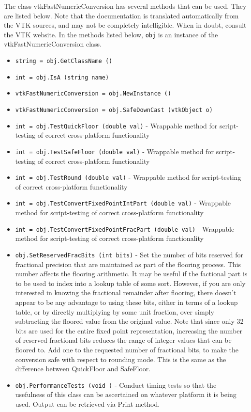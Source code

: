 The class vtkFastNumericConversion has several methods that can be used.
  They are listed below.
Note that the documentation is translated automatically from the VTK sources,
and may not be completely intelligible.  When in doubt, consult the VTK website.
In the methods listed below, \verb|obj| is an instance of the vtkFastNumericConversion class.
\begin{itemize}
\item  \verb|string = obj.GetClassName ()|

\item  \verb|int = obj.IsA (string name)|

\item  \verb|vtkFastNumericConversion = obj.NewInstance ()|

\item  \verb|vtkFastNumericConversion = obj.SafeDownCast (vtkObject o)|

\item  \verb|int = obj.TestQuickFloor (double val)| -  Wrappable method for script-testing of correct cross-platform
 functionality

\item  \verb|int = obj.TestSafeFloor (double val)| -  Wrappable method for script-testing of correct cross-platform
 functionality

\item  \verb|int = obj.TestRound (double val)| -  Wrappable method for script-testing of correct cross-platform
 functionality

\item  \verb|int = obj.TestConvertFixedPointIntPart (double val)| -  Wrappable method for script-testing of correct cross-platform
 functionality

\item  \verb|int = obj.TestConvertFixedPointFracPart (double val)| -  Wrappable method for script-testing of correct cross-platform
 functionality

\item  \verb|obj.SetReservedFracBits (int bits)| -  Set the number of bits reserved for fractional precision that are
 maintained as part of the flooring process. This number affects the
 flooring arithmetic. It may be useful if the factional part is to be
 used to index into a lookup table of some sort. However, if you are only
 interested in knowing the fractional remainder after flooring, there
 doesn't appear to be any advantage to using these bits, either in terms
 of a lookup table, or by directly multiplying by some unit fraction,
 over simply subtracting the floored value from the original value. Note
 that since only 32 bits are used for the entire fixed point
 representation, increasing the number of reserved fractional bits
 reduces the range of integer values that can be floored to.
 Add one to the requested number of fractional bits, to make
 the conversion safe with respect to rounding mode. This is the
 same as the difference between QuickFloor and SafeFloor.

\item  \verb|obj.PerformanceTests (void )| -  Conduct timing tests so that the usefulness of this class can be
 ascertained on whatever platform it is being used. Output can be
 retrieved via Print method.

\end{itemize}
